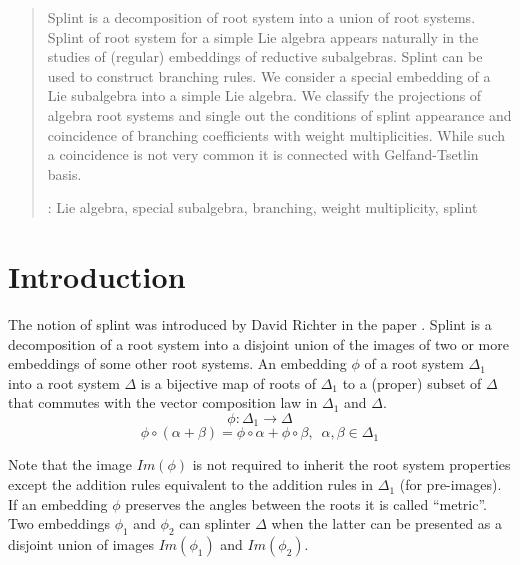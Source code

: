 \documentclass[12pt]{iopart}
\begin{document}

\author{V.D.~Lyakhovsky$^1$, A.A.~Nazarov$^{1,2}$, P.I.~Kakin$^{1}$}
\address{ $^1$ Department of High-energy and elementary particle physics,  St Petersburg State University, 198904, Saint-Petersburg, Russia}



\begin{abstract}
  Splint is a decomposition of root system into a union of root systems. Splint of root system for a
  simple Lie algebra appears naturally in the studies of (regular) embeddings of reductive
  subalgebras. Splint can be used to construct branching rules. We consider a special embedding of a
  Lie subalgebra into a simple Lie algebra. We classify the projections of algebra root systems and
  single out the conditions of splint appearance and coincidence of branching coefficients with
  weight multiplicities. While such a coincidence is not very common it is connected with
  Gelfand-Tsetlin basis.

: Lie algebra, special subalgebra, branching, weight multiplicity, splint
\end{abstract}

\submitto{\jpa}

\section{Introduction}
\label{sec:introduction}

The notion of splint was introduced by David Richter in the paper \cite{richter2008splints}. Splint
is a decomposition of a root system into a disjoint union of the images of two or more embeddings of some
other root systems. An embedding $\phi$ of a root system $\Delta_1$ into a root system $\Delta$ is a
bijective map of roots of $\Delta_{1}$ to a (proper) subset of $\Delta$ that commutes with the vector
composition law in $\Delta_{1}$ and $\Delta$.
\begin{equation*}
\phi:\Delta_1 \longrightarrow \Delta
\end{equation*}
\begin{equation*}
\phi \circ (\alpha + \beta) =\phi \circ \alpha + \phi \circ \beta,
\,\,\, \alpha,\beta \in \Delta_1
\end{equation*}

Note that the image $Im(\phi)$ is not required to inherit the root system properties except the
addition rules equivalent to the addition rules in $\Delta_{1}$ (for pre-images). If an embedding
$\phi$ preserves the angles between the roots it is called ``metric''. Two embeddings $\phi_1$ and
$\phi_2$ can splinter $\Delta$ when the latter can be presented as a disjoint union of images
$Im(\phi_1)$ and $Im(\phi_2)$.
\end{document}
